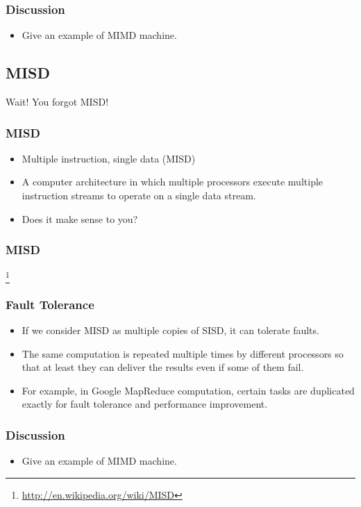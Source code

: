 \documentclass{beamer}
\begin{document}
\begin{CJK}{UTF8}{bsmi}
\begin{frame}
\frametitle{Discussion}
\begin{itemize}
\item Give an example of MIMD machine.
\end{itemize}
\end{frame}

\subsection{MISD}

\begin{frame}
\huge Wait! You forgot MISD!
\end{frame}

\begin{frame}
\frametitle{MISD}
\begin{itemize}
\item Multiple instruction, single data (MISD) 
\item A computer architecture in which multiple processors execute
  multiple instruction streams to operate on a single data stream.
\item Does it make sense to you?
\end{itemize}
\end{frame}

\begin{frame}
\frametitle{MISD}
\centerline{}
\footnote{\url{http://en.wikipedia.org/wiki/MISD}}
\end{frame}

\begin{frame}
\frametitle{Fault Tolerance}
\begin{itemize}
\item If we consider MISD as multiple copies of SISD, it can tolerate faults.
\item The same computation is repeated multiple times by different processors so that at least they can deliver the results even if some of them fail.
\item For example, in Google MapReduce computation, certain tasks are duplicated exactly for fault tolerance and performance improvement.
\end{itemize}
\end{frame}

\begin{frame}
\frametitle{Discussion}
\begin{itemize}
\item Give an example of MIMD machine.
\end{itemize}
\end{frame}

\end{CJK}
\end{document}
